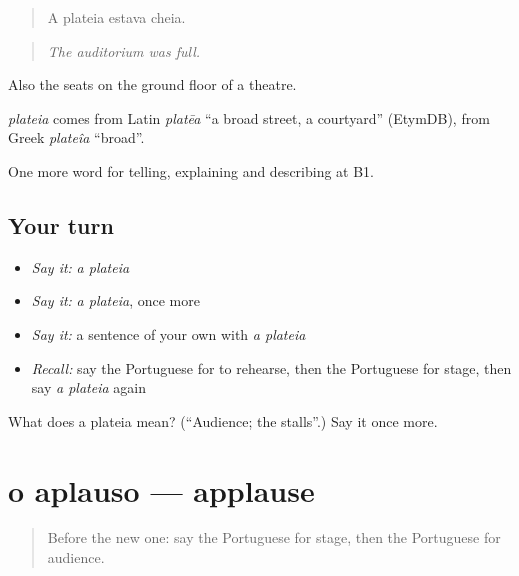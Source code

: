 \begin{quote}
A plateia estava cheia.
\end{quote}

\begin{quote}
\emph{The auditorium was full.}
\end{quote}

Also the seats on the ground floor of a theatre.

\begin{cousinweb}
\emph{plateia} comes from Latin \emph{platēa} \textquotedblleft{}a broad street, a courtyard\textquotedblright{} (EtymDB), from Greek \emph{plateîa} \textquotedblleft{}broad\textquotedblright{}.
\end{cousinweb}

\begin{grammarlens}[title={What you've built}]
One more word for telling, explaining and describing at B1.
\end{grammarlens}

\subsection*{Your turn}
\begin{itemize}
\raggedright
  \item \emph{Say it:} \emph{a plateia}
  \item \emph{Say it:} \emph{a plateia}, once more
  \item \emph{Say it:} a sentence of your own with \emph{a plateia}
  \item \emph{Recall:} say the Portuguese for to rehearse, then the Portuguese for stage, then say \emph{a plateia} again
\end{itemize}

\begin{tcolorbox}[breakable,colback=teal!4,colframe=teal!35!black,title={Before you move on}]
What does a plateia mean? (\textquotedblleft{}Audience; the stalls\textquotedblright{}.) Say it once more.
\end{tcolorbox}
\section[o aplauso]{o aplauso — applause}

\label{lesson:PT-C519-aplauso}



\begin{quote}
Before the new one: say the Portuguese for stage, then the Portuguese for audience.
\end{quote}

